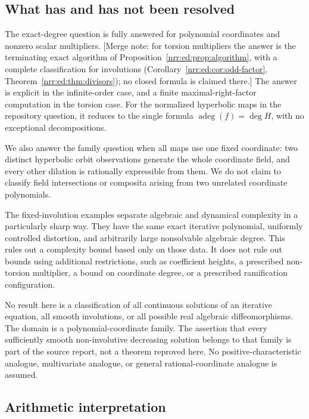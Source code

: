 \documentclass[11pt,letterpaper]{article}
\theoremstyle{definition}
\theoremstyle{remark}
\newcommand{\algdeg}{\operatorname{adeg}}
\begin{document}
\subsection{What has and has not been resolved}

The exact-degree question is fully answered for polynomial coordinates and
nonzero scalar multipliers. [Merge note: for torsion multipliers the answer
is the terminating exact algorithm of Proposition~\ref{nrr:ed:prop:algorithm},
with a complete classification for involutions
(Corollary~\ref{nrr:ed:cor:odd-factor}, Theorem~\ref{nrr:ed:thm:divisors});
no closed formula is claimed there.] The answer is explicit in the infinite-order case,
and a finite maximal-right-factor computation in the torsion case. For the
normalized hyperbolic maps in the repository question, it reduces to the single
formula $\algdeg(f)=\deg H$, with no exceptional decompositions.

We also answer the family question when all maps use one fixed coordinate:
two distinct hyperbolic orbit observations generate the whole coordinate field,
and every other dilation is rationally expressible from them. We do not claim
to classify field intersections or composita arising from two unrelated
coordinate polynomials.

The fixed-involution examples separate algebraic and dynamical complexity in a
particularly sharp way. They have the same exact iterative polynomial, uniformly
controlled distortion, and arbitrarily large nonsolvable algebraic degree. This
rules out a complexity bound based only on those data. It does not rule out
bounds using additional restrictions, such as coefficient heights, a prescribed
non-torsion multiplier, a bound on coordinate degree, or a prescribed ramification
configuration.

No result here is a classification of all continuous solutions of an iterative
equation, all smooth involutions, or all possible real algebraic diffeomorphisms.
The domain is a polynomial-coordinate family. The assertion that every sufficiently
smooth non-involutive decreasing solution belongs to that family is part of the
source report, not a theorem reproved here. No positive-characteristic analogue,
multivariate analogue, or general rational-coordinate analogue is assumed.

\subsection{Arithmetic interpretation}
\end{document}
